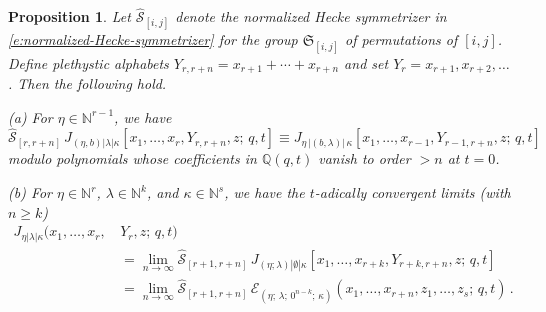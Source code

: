 \documentclass[12pt]{amsart}
\newtheorem{prop}[thm]{Proposition}
\theoremstyle{definition}
\theoremstyle{remark}
\newcommand{\NN}{{\mathbb N}}
\newcommand{\QQ}{{\mathbb Q}}
\newcommand{\Sfrak}{{\mathfrak S}}
\newcommand{\Ecal}{{\mathcal E}}
\newcommand{\Scal}{{\mathcal S}}
\newcommand{\hsym}{\widehat{\Scal}}    %
\newcommand{\Jns}{J}           %
\begin{document}
\begin{prop}\label{prop:limits-of-symmetrizers}
Let $\hsym _{[i,j]}$ denote the normalized Hecke symmetrizer in
\eqref{e:normalized-Hecke-symmetrizer} for the group $\Sfrak _{[i,j]}$
of permutations of $[i,j]$.  Define plethystic alphabets $Y_{r,r+n} =
x_{r+1}+\cdots +x_{r+n}$ and set $Y_{r} = x_{r+1}, x_{r+2}, \ldots $.
Then the following hold.

(a) For $\eta \in \NN ^{r-1}$, we have
\begin{equation}\label{e:one-S}
\hsym _{[r,r+n]}\, \Jns _{(\eta ,b)|\lambda |\kappa }[x_{1}, \ldots,
x_{r}, Y_{r,r+n} ,z;\, q,t] \equiv \Jns _{\eta\, |(b,\lambda) |\,
\kappa }[x_{1},\ldots,x_{r-1},Y_{r-1,r+n},z;\, q,t] \,
\end{equation}
modulo polynomials whose coefficients in $\QQ (q,t)$ vanish to order
$>n$ at $t=0$.

(b) For $\eta \in \NN ^{r}$, $\lambda \in \NN ^{k}$, and $\kappa \in
\NN ^{s}$, we have the $t$-adically convergent limits (with $n\geq k$)
\begin{equation}\label{e:many-S-limit}
\begin{aligned}
\Jns _{\eta |\lambda |\kappa }(x_{1},\ldots,x_{r},\, & Y_{r},z;\, q,t)\\
& =\lim_{n\rightarrow \infty } \hsym _{[r+1,r+n]} \, \Jns _{(\eta
;\lambda ) |\emptyset |\kappa
}[x_{1},\ldots,x_{r+k},Y_{r+k,r+n},z;\,
q,t]\\
& = \lim_{n\rightarrow \infty } \hsym _{[r+1,r+n]}\, \Ecal _{(\eta
;\, \lambda ;\, 0^{n-k};\, \kappa
)}(x_{1},\ldots,x_{r+n},z_{1},\ldots,z_{s};\, q,t)\, .
\end{aligned}
\end{equation}
\end{prop}
\end{document}
